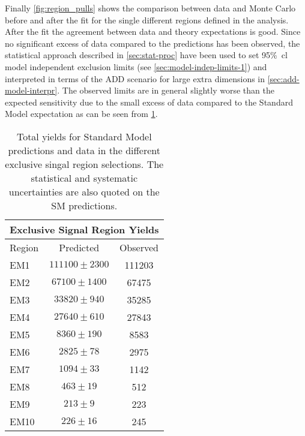 Finally \cref{fig:region_pulls} shows the comparison between data and Monte
Carlo before and after the fit for the single different regions defined in the
analysis. After the fit the agreement between data and theory expectations is
good. Since no significant excess of data compared to the predictions has been
observed, the statistical approach described in \cref{sec:stat-proc} have been
used to set 95\%~\gls{cl} model independent exclusion limits (see
\cref{sec:model-indep-limits-1}) and interpreted in terms of the ADD scenario
for large extra dimensions in \cref{sec:add-model-interpr}. The observed limits
are in general slightly worse than the expected sensitivity due to the small
excess of data compared to the Standard Model expectation as can be seen from
\cref{tab:sr_yields}.
\begin{table}[!h]
  \centering
  \begin{tabular}{lcc}
    \toprule
    \multicolumn{3}{c}{Exclusive Signal Region Yields} \\
    \midrule \midrule
    Region & Predicted & Observed \\
    \midrule
    EM1 & $111100 \pm 2300$ & 111203 \\
    EM2 & $67100 \pm 1400$ & 67475 \\
    EM3 & $33820 \pm 940$ & 35285 \\
    EM4 & $27640 \pm 610$ & 27843 \\
    EM5 & $8360 \pm 190$ & 8583 \\
    EM6 & $2825 \pm 78$ & 2975 \\
    EM7 & $1094 \pm 33$ & 1142 \\
    EM8 & $463 \pm 19$ & 512 \\
    EM9 & $213 \pm 9$ & 223 \\
    EM10 & $226 \pm 16$ & 245 \\
    \bottomrule
  \end{tabular}
  \caption{Total yields for Standard Model predictions and data in the different
    exclusive singal region selections. The statistical and systematic
    uncertainties are also quoted on the SM predictions.}
  \label{tab:sr_yields}
\end{table}
